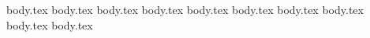 \chapter{\fourseck{}}
{body.tex}
{body.tex}
{body.tex}
{body.tex}
{body.tex}
{body.tex}
{body.tex}
{body.tex}
{body.tex}
{body.tex}
